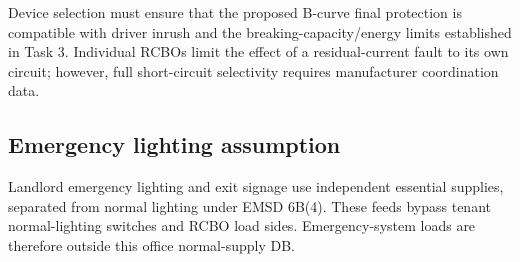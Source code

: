 Device selection must ensure that the proposed B-curve final protection is compatible with driver inrush and the breaking-capacity/energy limits established in Task 3. Individual RCBOs limit the effect of a residual-current fault to its own circuit; however, full short-circuit selectivity requires manufacturer coordination data.
\subsection*{Emergency lighting assumption}
Landlord emergency lighting and exit signage use independent essential supplies, separated from normal lighting under EMSD 6B(4). These feeds bypass tenant normal-lighting switches and RCBO load sides. Emergency-system loads are therefore outside this office normal-supply DB.

